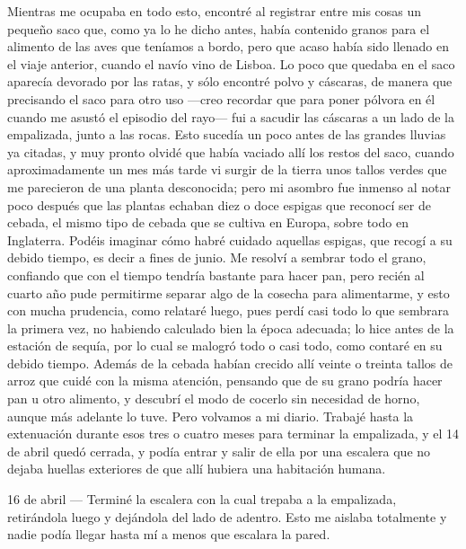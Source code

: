 \documentclass{novela}
\begin{document}
    Mientras me ocupaba en todo esto, encontré al registrar entre mis cosas un pequeño saco que, como ya lo he dicho antes, había contenido granos para el alimento de las aves que teníamos a bordo, pero que acaso había sido llenado en el viaje anterior, cuando el navío vino de Lisboa. Lo poco que quedaba en el saco aparecía devorado por las ratas, y sólo encontré polvo y cáscaras, de manera que precisando el saco para otro uso —creo recordar que para poner pólvora en él cuando me asustó el episodio del rayo— fui a sacudir las cáscaras a un lado de la empalizada, junto a las rocas. Esto sucedía un poco antes de las grandes lluvias ya citadas, y muy pronto olvidé que había vaciado allí los restos del saco, cuando aproximadamente un mes más tarde vi surgir de la tierra unos tallos verdes que me parecieron de una planta desconocida; pero mi asombro fue inmenso al notar poco después que las plantas echaban diez o doce espigas que reconocí ser de cebada, el mismo tipo de cebada que se cultiva en Europa, sobre todo en Inglaterra.
    Podéis imaginar cómo habré cuidado aquellas espigas, que recogí a su debido tiempo, es decir a fines de junio. Me resolví a sembrar todo el grano, confiando que con el tiempo tendría bastante para hacer pan, pero recién al cuarto año pude permitirme separar algo de la cosecha para alimentarme, y esto con mucha prudencia, como relataré luego, pues perdí casi todo lo que sembrara la primera vez, no habiendo calculado bien la época adecuada; lo hice antes de la estación de sequía, por lo cual se malogró todo o casi todo, como contaré en su debido tiempo.
    Además de la cebada habían crecido allí veinte o treinta tallos de arroz que cuidé con la misma atención, pensando que de su grano podría hacer pan u otro alimento, y descubrí el modo de cocerlo sin necesidad de horno, aunque más adelante lo tuve. Pero volvamos a mi diario.
    Trabajé hasta la extenuación durante esos tres o cuatro meses para terminar la empalizada, y el 14 de abril quedó cerrada, y podía entrar y salir de ella por una escalera que no dejaba huellas exteriores de que allí hubiera una habitación humana.


    16 de abril — Terminé la escalera con la cual trepaba a la empalizada, retirándola luego y dejándola del lado de adentro. Esto me aislaba totalmente y nadie podía llegar hasta mí a menos que escalara la pared.
\end{document}
